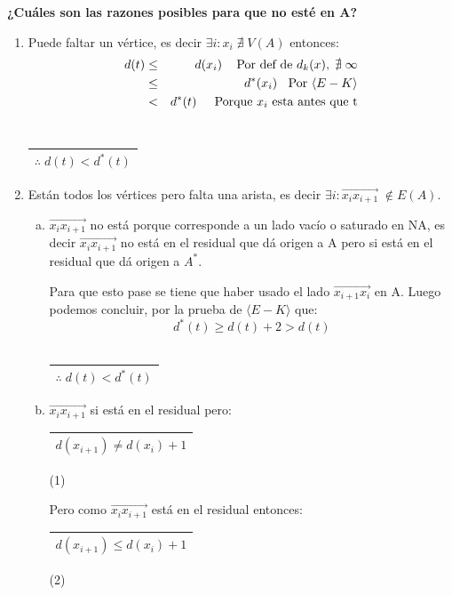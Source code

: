 \documentclass[12pt,a4paper]{report}
\newcounter{neq}
\begin{document}
			\vspace{5mm}
			\textbf{¿Cuáles son las razones posibles para que no esté en A?}
				\begin{enumerate}
					\item Puede faltar un vértice, es decir $\exists i : x_{i} \; \nexists \; V(A)$ entonces:
						\begin{eqnarray}
							\nonumber d(t) &\leq & d(x_{i}) \; \; \; \textup{ Por def de } d_{k}(x), \; \nexists \; \infty \\
							\nonumber &\leq & d^{*}(x_{i}) \; \; \textup { Por } \langle E-K \rangle \\
							\nonumber &< & d^{*}(t) \; \; \; \; \textup{ Porque } x_{i} \textup{ esta antes que t}
						\end{eqnarray}
						$\qquad\qquad\qquad\qquad\;$
						\begin{tabular}{|c|} \hline $\therefore \; d(t) < d^{*}(t)$ \\\hline \end{tabular}
					\item Están todos los vértices pero falta una arista, es decir $\exists i : \overrightarrow{x_{i}x_{i + 1}} \; \notin E(A)$.
						\begin{enumerate}[a)]
							\item $\overrightarrow{x_{i}x_{i + 1}}$ no está porque corresponde a un lado vacío o saturado en NA, es decir $\overrightarrow{x_{i}x_{i + 1}}$ no está en el residual que dá origen a A pero si está en el residual que dá origen a $A^{*}$.
								\par Para que esto pase se tiene que haber usado el lado $\overrightarrow{x_{i + 1}x_{i}}$ en A. Luego podemos concluir, por la prueba de $\langle E-K\rangle$ que:
								\[ d^{*}(t) \geq d(t) + 2 > d(t) \]
								$\qquad\qquad\qquad\qquad\qquad\qquad$
								\begin{tabular}{|c|} \hline $\therefore \; d(t) < d^{*}(t)$ \\\hline \end{tabular}
							\item $\overrightarrow{x_{i}x_{i + 1}}$ si está en el residual pero:
								\begin{tabular}{|c|} \hline $d(x_{i+1}) \neq d(x_{i}) +1 $ \\ \hline \end{tabular} (1)

								\vspace{5mm}
								\par Pero como $\overrightarrow{x_{i}x_{i + 1}}$ está en el residual entonces:
								\begin{tabular}{|c|} \hline $d(x_{i+1}) \leq d(x_{i}) +1 $ \\ \hline \end{tabular} (2)


\end{enumerate}
\end{enumerate}
\end{document}
